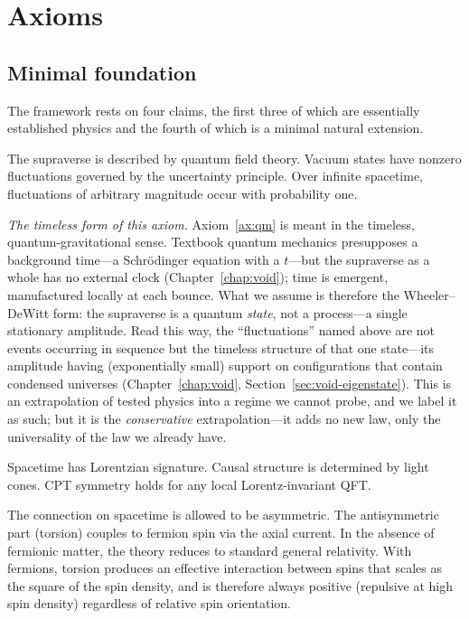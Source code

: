 \chapter{Axioms}
\label{chap:axioms}

\section{Minimal foundation}

The framework rests on four claims, the first three of which are essentially
established physics and the fourth of which is a minimal natural extension.

\begin{axiom}\label{ax:qm}
The supraverse is described by quantum field theory. Vacuum states have nonzero
fluctuations governed by the uncertainty principle. Over infinite spacetime,
fluctuations of arbitrary magnitude occur with probability one.
\end{axiom}

\noindent\emph{The timeless form of this axiom.} Axiom~\ref{ax:qm} is meant in
the timeless, quantum-gravitational sense. Textbook quantum mechanics presupposes
a background time---a Schr\"odinger equation with a $t$---but the supraverse as a
whole has no external clock (Chapter~\ref{chap:void}); time is emergent,
manufactured locally at each bounce. What we assume is therefore the
Wheeler--DeWitt form: the supraverse is a quantum \emph{state}, not a
process---a single stationary amplitude. Read this way, the ``fluctuations'' named
above are not events occurring in sequence but the timeless structure of that one
state---its amplitude having (exponentially small) support on configurations that
contain condensed universes (Chapter~\ref{chap:void},
Section~\ref{sec:void-eigenstate}). This is an extrapolation of tested physics
into a regime we cannot probe, and we label it as such; but it is the
\emph{conservative} extrapolation---it adds no new law, only the universality of
the law we already have.

\begin{axiom}\label{ax:sr}
Spacetime has Lorentzian signature. Causal structure is determined by light
cones. CPT symmetry holds for any local Lorentz-invariant QFT.
\end{axiom}

\begin{axiom}\label{ax:ec}
The connection on spacetime is allowed to be asymmetric. The antisymmetric part
(torsion) couples to fermion spin via the axial current. In the absence of
fermionic matter, the theory reduces to standard general relativity. With
fermions, torsion produces an effective interaction between spins that scales as
the square of the spin density, and is therefore always positive (repulsive at
high spin density) regardless of relative spin orientation.
\end{axiom}

